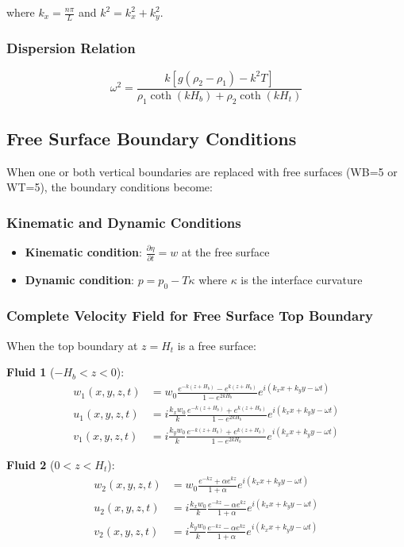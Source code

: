 \documentclass[12pt,a4paper]{article}
\begin{document}
where $k_x = \frac{n\pi}{L}$ and $k^2 = k_x^2 + k_y^2$.

\subsubsection{Dispersion Relation}
\begin{equation}
\omega^2 = \frac{k[g(\rho_2 - \rho_1) - k^2T]}{\rho_1\coth(kH_b) + \rho_2\coth(kH_t)}
\end{equation}

\subsection{Free Surface Boundary Conditions}

When one or both vertical boundaries are replaced with free surfaces (WB=5 or WT=5), the boundary conditions become:

\subsubsection{Kinematic and Dynamic Conditions}
\begin{itemize}
    \item \textbf{Kinematic condition}: $\frac{\partial \eta}{\partial t} = w$ at the free surface
    \item \textbf{Dynamic condition}: $p = p_0 - T\kappa$ where $\kappa$ is the interface curvature
\end{itemize}

\subsubsection{Complete Velocity Field for Free Surface Top Boundary}

When the top boundary at $z = H_t$ is a free surface:

\textbf{Fluid 1} ($-H_b < z < 0$):
\begin{align}
w_1(x,y,z,t) &= w_0 \frac{e^{-k(z+H_b)} - e^{k(z+H_b)}}{1 - e^{2kH_b}} e^{i(k_x x + k_y y - \omega t)} \\
u_1(x,y,z,t) &= i\frac{k_x w_0}{k} \frac{e^{-k(z+H_b)} + e^{k(z+H_b)}}{1 - e^{2kH_b}} e^{i(k_x x + k_y y - \omega t)} \\
v_1(x,y,z,t) &= i\frac{k_y w_0}{k} \frac{e^{-k(z+H_b)} + e^{k(z+H_b)}}{1 - e^{2kH_b}} e^{i(k_x x + k_y y - \omega t)}
\end{align}

\textbf{Fluid 2} ($0 < z < H_t$):
\begin{align}
w_2(x,y,z,t) &= w_0 \frac{e^{-kz} + \alpha e^{kz}}{1 + \alpha} e^{i(k_x x + k_y y - \omega t)} \\
u_2(x,y,z,t) &= i\frac{k_x w_0}{k} \frac{e^{-kz} - \alpha e^{kz}}{1 + \alpha} e^{i(k_x x + k_y y - \omega t)} \\
v_2(x,y,z,t) &= i\frac{k_y w_0}{k} \frac{e^{-kz} - \alpha e^{kz}}{1 + \alpha} e^{i(k_x x + k_y y - \omega t)}
\end{align}
\end{document}

